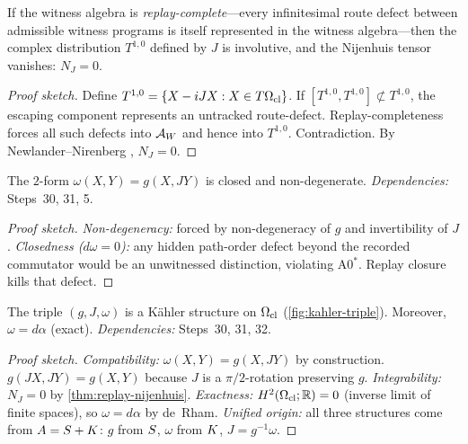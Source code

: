 \begin{theorem}[Replay-Completeness Implies $N_J = 0$]
\label{thm:replay-nijenhuis}
If the witness algebra is \emph{replay-complete}---every infinitesimal
route defect between admissible witness programs is itself represented in
the witness algebra---then the complex distribution $T^{1,0}$ defined by
$J$ is involutive, and the Nijenhuis tensor vanishes: $N_J = 0$.
\begin{proof}[Proof sketch]
Define $T^{1,0} = \{X - iJX : X \in T\Omega_{\mathrm{cl}}\}$.  If
$[T^{1,0}, T^{1,0}] \not\subset T^{1,0}$, the escaping component
represents an untracked route-defect.  Replay-completeness forces all
such defects into $\mathcal{A}_W$ and hence into $T^{1,0}$.  Contradiction.
By Newlander--Nirenberg \citep{newlander1957}, $N_J = 0$.
\end{proof}
\end{theorem}

\begin{theorem}
\label{thm:symplectic-form}
The $2$-form $\omega(X, Y) = g(X, JY)$ is closed and non-degenerate.
\emph{Dependencies:} Steps~30, 31, 5.
\begin{proof}[Proof sketch]
\emph{Non-degeneracy:} forced by non-degeneracy of $g$ and invertibility
of $J$.  \emph{Closedness ($d\omega = 0$):} any hidden path-order defect
beyond the recorded commutator would be an unwitnessed distinction,
violating A0$^*$.  Replay closure kills that defect.
\end{proof}
\end{theorem}

\begin{theorem}
\label{thm:kahler}
The triple $(g, J, \omega)$ is a K\"{a}hler structure on $\Omega_{\mathrm{cl}}$
(\cref{fig:kahler-triple}).  Moreover, $\omega = d\alpha$ (exact).
\emph{Dependencies:} Steps~30, 31, 32.
\begin{proof}[Proof sketch]
\emph{Compatibility:} $\omega(X, Y) = g(X, JY)$ by construction.
$g(JX, JY) = g(X, Y)$ because $J$ is a $\pi/2$-rotation preserving $g$.
\emph{Integrability:} $N_J = 0$ by \cref{thm:replay-nijenhuis}.
\emph{Exactness:} $H^2(\Omega_{\mathrm{cl}}; \mathbb{R}) = 0$ (inverse limit of
finite spaces), so $\omega = d\alpha$ by de~Rham.
\emph{Unified origin:} all three structures come from $A = S + K$:
$g$ from $S$, $\omega$ from $K$, $J = g^{-1}\omega$.
\end{proof}
\end{theorem}

